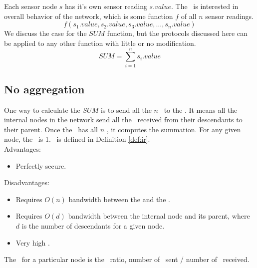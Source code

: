 	Each sensor node $s$ has it's own sensor reading $s.value$. The \bs\ is interested in overall behavior of the network, which is some function $f$ of all $n$ sensor readings.
	\begin{equation}
		f(s_{1}.value, s_{2}.value, s_{3}.value, \dotsc, s_{n}.value)
	\end{equation}
	We discuss the case for the $SUM$ function, but the protocols discussed here can be applied to any other function with little or no modification. 
	\begin{equation}
		SUM = \sum\limits_{i=1}^n s_{i}.value
	\end{equation}

	\subsection{No aggregation}
		One way to calculate the $SUM$ is to send all the $n$ \payloads\ to the \bs.
		It means all the internal nodes in the network send all the \payloads\ received from their descendants to their parent.
		Once the \bs\ has all $n$ \payloads, it computes the summation.
		For any given node, the \inforate\ is 1. \inforate\ is defined in Definition \ref{def:ir}.\\
		Advantages:
		\begin{itemize}
			\item Perfectly secure.
		\end{itemize}
		Disadvantages:
		\begin{itemize}
			\item Requires $O(n)$ bandwidth between the \bs and the \bs.
			\item Requires $O(d)$ bandwidth between the internal node and its parent, where $d$ is the number of descendants for a given node.
			\item Very high \inforate.
		\end{itemize}
			
	\begin{definition}\label{def:ir}
		The \inforate\ for a particular node is the \payloads\ ratio, number of \payloads\ sent / number of \payloads\ received.
	\end{definition}

